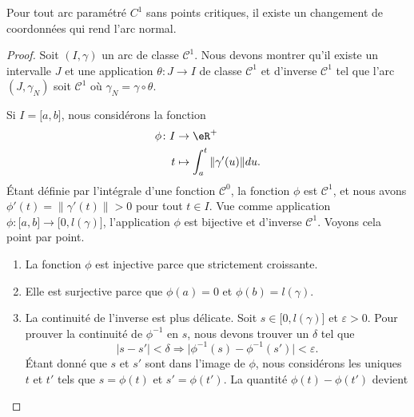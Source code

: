 \begin{proposition}     \label{PropExisteChmNorm}
	Pour tout arc paramétré \( C^1\) sans points critiques, il existe un changement de coordonnées qui rend l'arc normal.
\end{proposition}

\begin{proof}
	Soit \( (I,\gamma)\) un arc de classe \( \mathcal{C}^1\). Nous devons montrer qu'il existe un intervalle \( J\) et une application \( \theta\colon J\to I\) de classe \( \mathcal{C}^1\) et d'inverse \( \mathcal{C}^1\) tel que l'arc \( (J,\gamma_N)\) soit \( \mathcal{C}^1\) où \( \gamma_N=\gamma\circ\theta\).

	Si \( I=\mathopen[ a ,b \mathclose]\), nous considérons la fonction
	\begin{equation}        \label{EqDevVarPhi}
		\begin{aligned}
			\phi\colon I & \to \eR^+                           \\
			t            & \mapsto \int_a^t\| \gamma'(u) \|du.
		\end{aligned}
	\end{equation}
	Étant définie par l'intégrale d'une fonction \( \mathcal{C}^0\), la fonction \( \phi\) est \( \mathcal{C}^1\), et nous avons \( \phi'(t)=\| \gamma'(t) \|>0\) pour tout \( t\in I\). Vue comme application \( \phi\colon \mathopen[ a , b \mathclose]\to \mathopen[ 0 , l(\gamma) \mathclose]\), l'application \( \phi\) est bijective et d'inverse \( \mathcal{C}^1\). Voyons cela point par point.
	\begin{enumerate}
		\item
		      La fonction \( \phi\) est injective parce que strictement croissante.
		\item
		      Elle est surjective parce que \( \phi(a)=0\) et \( \phi(b)=l(\gamma)\).
		\item
		      La continuité de l'inverse est plus délicate. Soit \( s\in\mathopen[ 0 , l(\gamma) \mathclose]\) et \( \varepsilon>0\). Pour prouver la continuité de \( \phi^{-1}\) en \( s\), nous devons trouver un \( \delta\) tel que
		      \begin{equation}
			      | s-s' |<\delta\Rightarrow\big| \phi^{-1}(s)-\phi^{-1}(s') \big|<\varepsilon.
		      \end{equation}
		      Étant donné que \( s\) et \( s'\) sont dans l'image de \( \phi\), nous considérons les uniques \( t\) et \( t'\) tels que \( s=\phi(t)\) et \( s'=\phi(t')\). La quantité \( \phi(t)-\phi(t')\) devient
		      \begin{equation}        \label{EqCondvpemuCont}

\end{equation}
\end{enumerate}
\end{proof}
